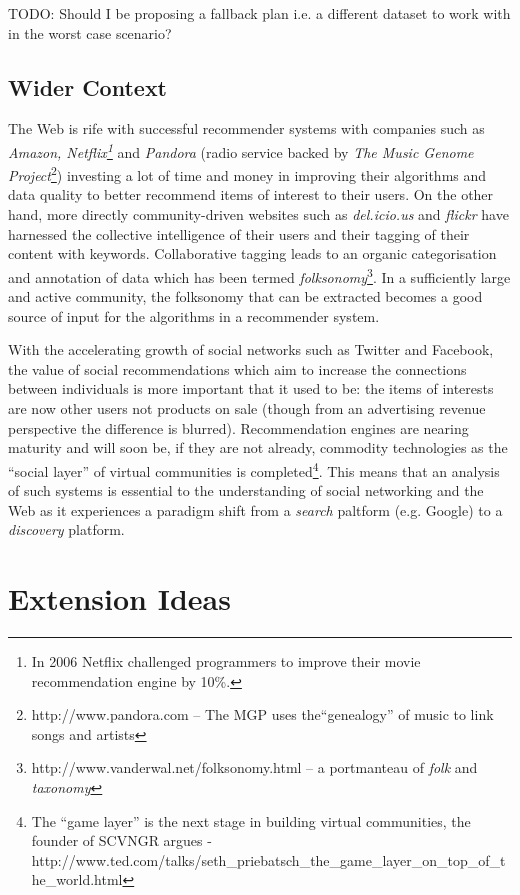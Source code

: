 TODO: Should I be proposing a fallback plan i.e. a different dataset to work with in the worst case scenario?

\subsection*{Wider Context}

The Web is rife with successful recommender systems with companies such as \textit{Amazon, Netflix\footnote{In 2006 Netflix challenged programmers to improve their movie recommendation engine by 10\%.}} and \textit{Pandora} (radio service backed by \textit{The Music Genome Project}\footnote{http://www.pandora.com -- The MGP uses the``genealogy'' of music to link songs and artists}) investing a lot of time and money in improving their algorithms and data quality to better recommend items of interest to their users. On the other hand, more directly community-driven websites such as \textit{del.icio.us} and \textit{flickr} have harnessed the collective intelligence of their users and their tagging of their content with keywords. Collaborative tagging leads to an organic categorisation and annotation of data which has been termed \textit{folksonomy}\footnote{http://www.vanderwal.net/folksonomy.html -- a portmanteau of \textit{folk} and \textit{taxonomy} }. In a sufficiently large and active community, the folksonomy that can be extracted becomes a good source of input for the algorithms in a recommender system. 

With the accelerating growth of social networks such as Twitter and Facebook, the value of social recommendations which aim to increase the connections between individuals is more important that it used to be: the items of interests are now other users not products on sale (though from an advertising revenue perspective the difference is blurred). Recommendation engines are nearing maturity and will soon be, if they are not already, commodity technologies as the ``social layer'' of virtual communities is completed\footnote{The ``game layer'' is the next stage in building virtual communities, the founder of SCVNGR argues - http://www.ted.com/talks/seth\_priebatsch\_the\_game\_layer\_on\_top\_of\_the\_world.html}. This means that an analysis of such systems is essential to the understanding of social networking and the Web as it experiences a paradigm shift from a \emph{search} paltform (e.g. Google) to a \emph{discovery} platform.

\section{Extension Ideas}

